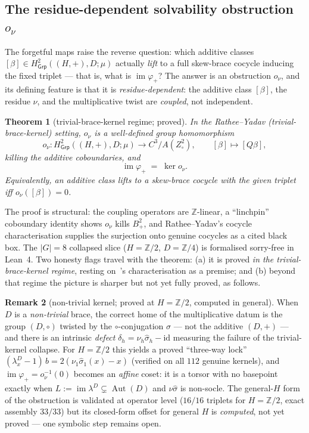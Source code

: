 \documentclass[11pt]{article}
\newtheorem{theorem}{Theorem}
\theoremstyle{definition}
\newtheorem{remark}[theorem]{Remark}
\newcommand{\Grp}{\mathsf{Grp}}
\newcommand{\Z}{\mathbb{Z}}
\newcommand{\id}{\mathrm{id}}
\newcommand{\im}{\operatorname{im}}
\newcommand{\Aut}{\operatorname{Aut}}
\newcommand{\shat}{\widehat{\sigma}}
\newcommand{\Hgp}{H^2_{\Grp}}
\begin{document}
\subsection{The residue-dependent solvability obstruction $o_\nu$}
The forgetful maps raise the reverse question: which additive classes
$[\beta]\in \Hgp((H,+),D;\mu)$ actually \emph{lift} to a full skew-brace cocycle inducing the
fixed triplet --- that is, what is $\im\varphi_+$? The answer is an obstruction $o_\nu$, and
its defining feature is that it is \emph{residue-dependent}: the additive class $[\beta]$, the
residue $\nu$, and the multiplicative twist are \emph{coupled}, not independent.

\begin{theorem}[trivial-brace-kernel regime; proved]\label{thm:onu}
In the Rathee--Yadav (trivial-brace-kernel) setting, $o_\nu$ is a well-defined group
homomorphism
\[
o_\nu\colon \Hgp((H,+),D;\mu)\longrightarrow C^3\big/A(Z^2_\circ),
\qquad [\beta]\mapsto[Q\beta],
\]
killing the additive coboundaries, and
\[
\im\varphi_+ \;=\; \ker o_\nu .
\]
Equivalently, an additive class lifts to a skew-brace cocycle with the given triplet iff
$o_\nu([\beta])=0$.
\end{theorem}

The proof is structural: the coupling operators are $\Z$-linear, a ``linchpin'' coboundary
identity shows $o_\nu$ kills $B^2_+$, and Rathee--Yadav's cocycle characterisation supplies
the surjection onto genuine cocycles as a cited black box. The $|G|=8$ collapsed slice
($H=\Z/2$, $D=\Z/4$) is formalised sorry-free in Lean~4. Two honesty flags travel with the
theorem: (a) it is proved \emph{in the trivial-brace-kernel regime}, resting on~\cite{RY}'s
characterisation as a premise; and (b) beyond that regime the picture is sharper but not yet
fully proved, as follows.

\begin{remark}[non-trivial kernel; proved at $H=\Z/2$, computed in general]\label{rmk:nontriv}
When $D$ is a \emph{non-trivial} brace, the correct home of the multiplicative datum is the
group $(D,\circ)$ twisted by the $\circ$-conjugation $\shat$ --- not the additive $(D,+)$ ---
and there is an intrinsic \emph{defect} $\delta_h=\nu_h\shat_h-\id$ measuring the failure of
the trivial-kernel collapse. For $H=\Z/2$ this yields a proved ``three-way lock''
$(\lambda^D_x-1)\,b = 2(\nu_1\shat_1(x)-x)$ (verified on all $112$ genuine kernels), and
$\im\varphi_+=o_\nu^{-1}(0)$ becomes an \emph{affine} coset: it is a torsor with no basepoint
exactly when $L:=\im\lambda^D\subsetneq\Aut(D)$ and $\nu\shat$ is non-socle. The general-$H$
form of the obstruction is validated at operator level ($16/16$ triplets for $H=\Z/2$, exact
assembly $33/33$) but its closed-form offset for general $H$ is \emph{computed}, not yet
proved --- one symbolic step remains open.
\end{remark}
\end{document}
